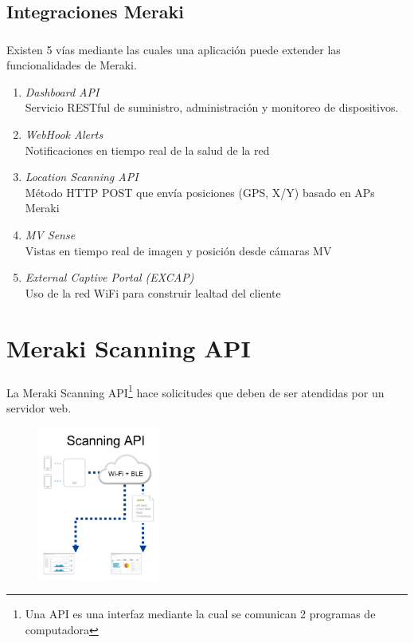 \documentclass{beamer}
\begin{document}
\subsection{\hspace{1in}Integraciones Meraki}
\begin{frame}
\frametitle{\currentname}
Existen 5 vías mediante las cuales una aplicación puede extender las funcionalidades de Meraki.
\begin{enumerate}
\item \emph{Dashboard API} \\
Servicio RESTful de suministro, administración y monitoreo de dispositivos.
\item \emph{WebHook Alerts} \\
Notificaciones en tiempo real de la salud de la red
\item \emph{Location Scanning API} \\
Método HTTP POST que envía posiciones (GPS, X/Y) basado en APs Meraki
\item \emph{MV Sense} \\
Vistas en tiempo real de imagen y posición desde cámaras MV
\item \emph{External Captive Portal (EXCAP)} \\
Uso de la red WiFi para construir lealtad del cliente
\end{enumerate}
\end{frame}

\section{\hspace{1in}Meraki Scanning API}
\begin{frame}
\frametitle{\currentname}
La Meraki Scanning API\footnote{Una API es una interfaz mediante la cual se comunican 2 programas de computadora} hace solicitudes que deben de ser atendidas por un servidor web.
\begin{figure}[H]
\includegraphics[width=4cm]{img/scanningapi.png}
\end{figure}
\end{frame}
\end{document}
